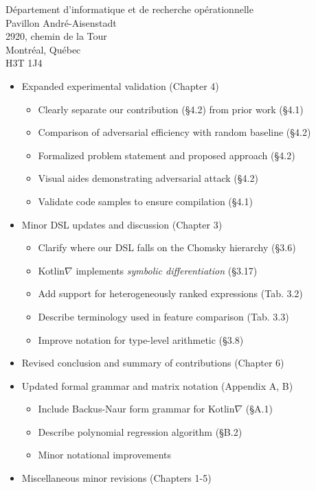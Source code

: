 \documentclass{letter}
\begin{document}
\begin{letter}{D\'epartement d'informatique et de recherche op\'erationnelle \\ Pavillon Andr\'e-Aisenstadt \\ 2920, chemin de la Tour \\ Montr\'eal, Qu\'ebec \\ H3T 1J4}
        \begin{itemize}
            \item Expanded experimental validation (Chapter 4)
                \begin{itemize}
                    \item Clearly separate our contribution (\S 4.2) from prior work (\S 4.1)
                    \item Comparison of adversarial efficiency with random baseline (\S 4.2)
                    \item Formalized problem statement and proposed approach (\S 4.2)
                    \item Visual aides demonstrating adversarial attack (\S 4.2)
                    \item Validate code samples to ensure compilation (\S 4.1)
                \end{itemize}
            \item Minor DSL updates and discussion (Chapter 3)
                \begin{itemize}
                    \item Clarify where our DSL falls on the Chomsky hierarchy (\S 3.6)
                    \item Kotlin$\nabla$ implements \textit{symbolic differentiation} (\S 3.17)
                    \item Add support for heterogeneously ranked expressions (Tab. 3.2)
                    \item Describe terminology used in feature comparison (Tab. 3.3)
                    \item Improve notation for type-level arithmetic (\S 3.8)
                \end{itemize}
            \item Revised conclusion and summary of contributions (Chapter 6)
            \item Updated formal grammar and matrix notation (Appendix A, B)
                \begin{itemize}
                    \item Include Backus-Naur form grammar for Kotlin$\nabla$ (\S A.1)
                    \item Describe polynomial regression algorithm (\S B.2)
                    \item Minor notational improvements
                \end{itemize}
            \item Miscellaneous minor revisions (Chapters 1-5)

\end{itemize}
\end{letter}
\end{document}
